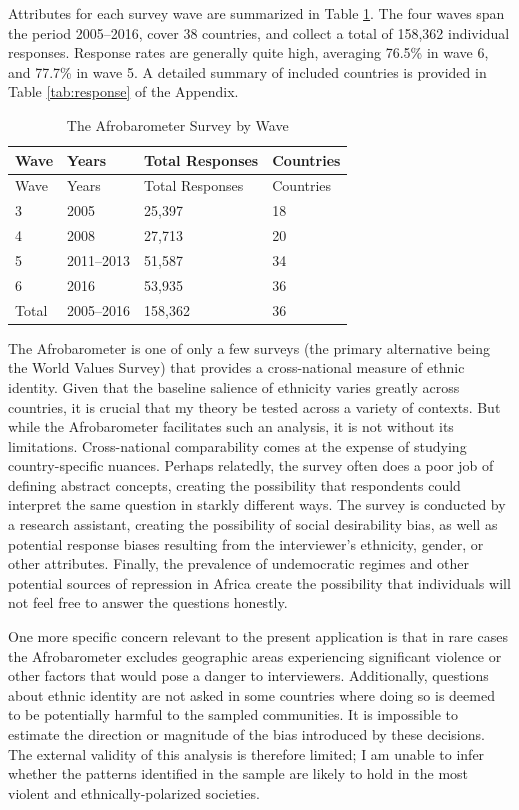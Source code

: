 \documentclass[12pt,]{book}
\theoremstyle{definition}
\theoremstyle{definition}
\theoremstyle{definition}
\theoremstyle{remark}
\begin{document}
Attributes for each survey wave are summarized in Table
\ref{tab:afro-topline}. The four waves span the period 2005--2016, cover
38 countries, and collect a total of 158,362 individual responses.
Response rates are generally quite high, averaging 76.5\% in wave 6, and
77.7\% in wave 5. A detailed summary of included countries is provided
in Table \ref{tab:response} of the Appendix.

\begin{longtable}[]{@{}llll@{}}
\caption{\label{tab:afro-topline} The Afrobarometer Survey by
Wave}\tabularnewline
\toprule
Wave & Years & Total Responses & Countries\tabularnewline
\midrule
\endfirsthead
\toprule
Wave & Years & Total Responses & Countries\tabularnewline
\midrule
\endhead
3 & 2005 & 25,397 & 18\tabularnewline
4 & 2008 & 27,713 & 20\tabularnewline
5 & 2011--2013 & 51,587 & 34\tabularnewline
6 & 2016 & 53,935 & 36\tabularnewline
Total & 2005--2016 & 158,362 & 36\tabularnewline
\bottomrule
\end{longtable}

The Afrobarometer is one of only a few surveys (the primary alternative
being the World Values Survey) that provides a cross-national measure of
ethnic identity. Given that the baseline salience of ethnicity varies
greatly across countries, it is crucial that my theory be tested across
a variety of contexts. But while the Afrobarometer facilitates such an
analysis, it is not without its limitations. Cross-national
comparability comes at the expense of studying country-specific nuances.
Perhaps relatedly, the survey often does a poor job of defining abstract
concepts, creating the possibility that respondents could interpret the
same question in starkly different ways. The survey is conducted by a
research assistant, creating the possibility of social desirability
bias, as well as potential response biases resulting from the
interviewer's ethnicity, gender, or other attributes. Finally, the
prevalence of undemocratic regimes and other potential sources of
repression in Africa create the possibility that individuals will not
feel free to answer the questions honestly.

One more specific concern relevant to the present application is that in
rare cases the Afrobarometer excludes geographic areas experiencing
significant violence or other factors that would pose a danger to
interviewers. Additionally, questions about ethnic identity are not
asked in some countries where doing so is deemed to be potentially
harmful to the sampled communities. It is impossible to estimate the
direction or magnitude of the bias introduced by these decisions. The
external validity of this analysis is therefore limited; I am unable to
infer whether the patterns identified in the sample are likely to hold
in the most violent and ethnically-polarized societies.
\end{document}
